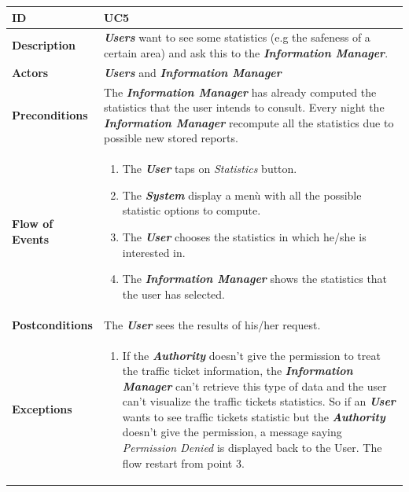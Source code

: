 \documentclass{report}
\begin{document}
\begin{tabularx}{\linewidth}{| l | X |}
	\hline
	\textbf{ID} & UC5\\
	
	\hline
	\textbf{Description} & \textbf{\textit{Users}} want to see some statistics (e.g the safeness of a certain area) and ask this to the \textbf{\textit{Information Manager}}.\\
	
	\hline
	\textbf{Actors} & \textbf{\textit{Users}} and \textbf{\textit{Information Manager}}\\
	
	\hline
	\textbf{Preconditions} & The \textbf{\textit{Information Manager}} has already computed the statistics that the user intends to consult. Every night the \textbf{\textit{Information Manager}} recompute all the statistics due to possible new stored reports. \\
	
	\hline
	\textbf{Flow of Events} & \parbox{0.7\textwidth}{\begin{enumerate}
			\item The \textbf{\textit{User}} taps on \textit{Statistics} button.
			\item The \textbf{\textit{System}} display a menù with all the possible statistic options to compute.
			\item The \textbf{\textit{User}} chooses the statistics in which he/she is interested in.
			
			
			\item The \textbf{\textit{Information Manager}} shows the statistics that the user has selected.
					
			
	\end{enumerate}}\\
	
	\hline
	\textbf{Postconditions} & The \textbf{\textit{User}} sees the results of his/her request.\\
	
	\hline
	\textbf{Exceptions} & \parbox{0.7\textwidth}{ \begin{enumerate}
			\item If the \textbf{\textit{Authority}} doesn't give the permission to treat the traffic ticket information, the \textbf{\textit{Information Manager}} can't retrieve this type of data and the user can't visualize the traffic tickets statistics. So if an \textbf{\textit{User}} wants to see traffic tickets statistic but the \textbf{\textit{Authority}} doesn't give the permission, a message saying \textit{Permission Denied} is displayed back to the User. The flow restart from point 3.  
		\end{enumerate}}\\
	
	\hline
	
\end{tabularx}
\end{document}

